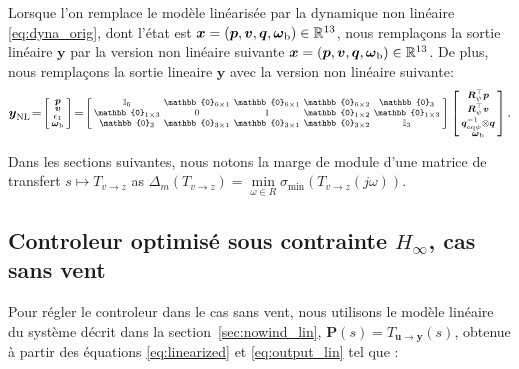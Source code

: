 Lorsque l'on remplace le modèle linéarisée par la dynamique non linéaire \eqref{eq:dyna_orig}, dont l'état est $\boldsymbol{x} = (\boldsymbol{p}, \boldsymbol{v}, \boldsymbol{q},\boldsymbol{\omega}_{\text{b}}) \in {\mathbb R}^{13} $,
nous remplaçons la sortie linéaire $\boldsymbol{y}$ par la version non linéaire suivante $\boldsymbol{x} = (\boldsymbol{p}, \boldsymbol{v},\boldsymbol{q},\boldsymbol{\omega}_{\text{b}}) \in {\mathbb R}^{13} $. 
De plus, nous remplaçons la sortie lineaire $\boldsymbol{y}$ avec la version non linéaire suivante:
\begin{align}
\label{eq:output}
    \boldsymbol{y}_{\text{NL}} \!=\! \smallmat{\boldsymbol{p}\\
     \boldsymbol{v}\\
     \epsilon_{1}\\
     \boldsymbol{\omega}_{\text{b}}} \!=\! \left[ \begin{smallmatrix} \mathbb{I}_{6} & \mathbb{0}_{6\times 1} & \mathbb{0}_{6\times 1} & \mathbb{0}_{6\times 2} & \mathbb{0}_{3}\\
     \mathbb{0}_{1\times 3} & 0 & 1 & \mathbb{0}_{1\times 2} & \mathbb{0}_{1 \times 3} \\
         \mathbb{0}_{3} & \mathbb{0}_{3\times 1} & \mathbb{0}_{3\times 1} & \mathbb{0}_{3\times 2} &   \mathbb{I}_{3}
         \end{smallmatrix} \right]
         \smallmat{\boldsymbol{R}^\top_{\psi}\boldsymbol{p} \\ \boldsymbol{R}^\top_{\psi}\boldsymbol{v} \\
\boldsymbol{q}_{\mathrm{eq}\psi}^{-1} \otimes \boldsymbol{q} \\
         \boldsymbol{\omega}_{\text{b}}  }.
\end{align}


Dans les sections suivantes, nous notons la marge de module d'une matrice de transfert $s \mapsto T_{v \rightarrow z}$ as $\Delta_m(T_{v \rightarrow z}) = \min\limits_{\omega\in R} \sigma_{\min}(T_{v \rightarrow z}(j\omega))$.



\subsection{Controleur optimisé sous contrainte $H_{\infty}$, cas sans vent}
\label{sec:zerowind}

Pour régler le controleur dans le cas sans vent, nous utilisons le modèle linéaire du système décrit dans la section~\ref{sec:nowind_lin}, $\boldsymbol{P}(s) = T_{\boldsymbol{u} \rightarrow \boldsymbol{y}}(s)$, obtenue à partir des équations \eqref{eq:linearized} et \eqref{eq:output_lin} tel que :

